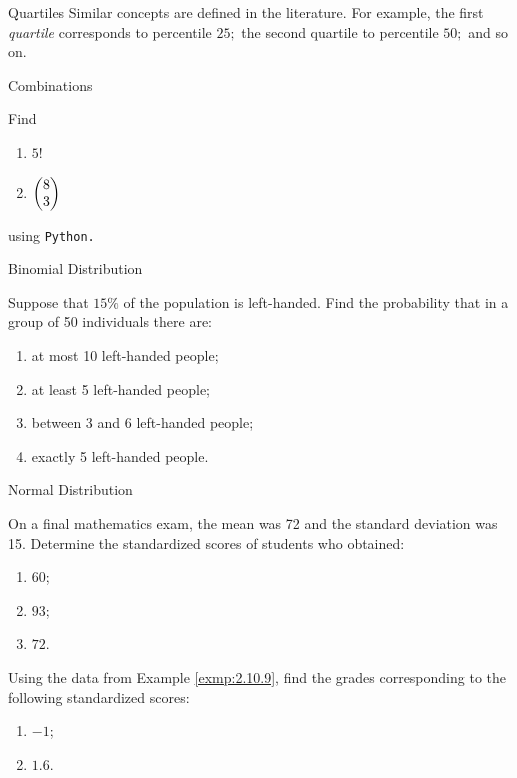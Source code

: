 {Quartiles}
Similar concepts are defined in the literature. For example, the first \emph{quartile} corresponds to percentile $25;$ the second quartile to percentile $50;$ and so on.

{Combinations}
\begin{ejemplo}
  \label{exmp:2.10.7}
  Find
  \begin{enumerate}
   \item $5!$
   \item $\begin{pmatrix} 8 \\ 3\end{pmatrix}$
  \end{enumerate}
  using \texttt{Python.}
\end{ejemplo}



{Binomial Distribution}
\begin{ejemplo}
  \label{exmp:2.10.8}
  Suppose that $15\%$ of the population is left-handed. Find the probability that in a group of 50 individuals there are:
  \begin{enumerate}
   \item at most 10 left-handed people;
   \item at least 5 left-handed people;
   \item between 3 and 6 left-handed people;
   \item exactly 5 left-handed people.
  \end{enumerate}
\end{ejemplo}



{Normal Distribution}
\begin{ejemplo}
  \label{exmp:2.10.9}
  On a final mathematics exam, the mean was 72 and the standard deviation was 15. Determine the standardized scores of students who obtained:
  \begin{enumerate}
   \item $60$;
   \item $93$;
   \item $72$.
  \end{enumerate}
\end{ejemplo}

\begin{ejemplo}
   \label{exmp:2.10.10}
   Using the data from Example \ref{exmp:2.10.9}, find the grades corresponding to the following standardized scores:
  \begin{enumerate}
   \item $-1$;
   \item $1.6$.
  \end{enumerate}
\end{ejemplo}

